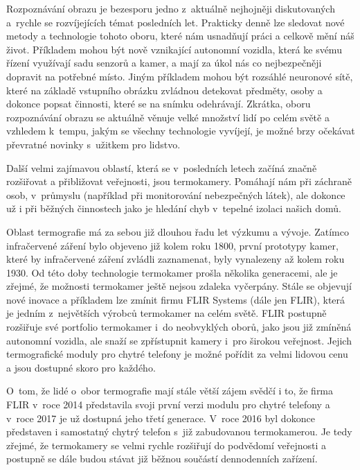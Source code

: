 \begin{introduction}
Rozpoznávání obrazu je bezesporu jedno z~aktuálně nejhojněji diskutovaných a~rychle se rozvíjejících témat posledních let. Prakticky denně lze sledovat nové metody a technologie tohoto oboru, které nám usnadňují práci a celkově mění náš život. Příkladem mohou být nově vznikající autonomní vozidla, která ke svému řízení využívají sadu senzorů a kamer, a mají za úkol nás co nejbezpečněji dopravit na potřebné místo. Jiným příkladem mohou být rozsáhlé neuronové sítě, které na základě vstupního obrázku zvládnou detekovat předměty, osoby a dokonce popsat činnosti, které se na snímku odehrávají. Zkrátka, oboru rozpoznávání obrazu se aktuálně věnuje velké množství lidí po celém světě a vzhledem k~tempu, jakým se všechny technologie vyvíjejí, je možné brzy očekávat převratné novinky s~užitkem pro lidstvo.

Další velmi zajímavou oblastí, která se v~posledních letech začíná značně rozšiřovat a přibližovat veřejnosti, jsou termokamery. Pomáhají nám při záchraně osob, v~průmyslu (například při monitorování nebezpečných látek), ale dokonce už i při běžných činnostech jako je hledání chyb v~tepelné izolaci našich domů.

Oblast termografie má za sebou již dlouhou řadu let výzkumu a vývoje. Zatímco infračervené záření bylo objeveno již kolem roku 1800, první prototypy kamer, které by infračervené záření zvládli zaznamenat, byly vynalezeny až kolem roku 1930. Od této doby technologie termokamer prošla několika generacemi, ale je zřejmé, že možnosti termokamer ještě nejsou zdaleka vyčerpány. Stále se objevují nové inovace a příkladem lze zmínit firmu FLIR Systems (dále jen FLIR), která je jedním z~největších výrobců termokamer na celém světě. FLIR postupně rozšiřuje své portfolio termokamer i~do neobvyklých oborů, jako jsou již zmíněná autonomní vozidla, ale snaží se zpřístupnit kamery i~pro širokou veřejnost. Jejich termografické moduly pro chytré telefony je možné pořídit za velmi lidovou cenu a jsou dostupné skoro pro každého. 

O~tom, že lidé o~obor termografie mají stále větší zájem svědčí i to, že firma FLIR v~roce 2014 představila svoji první verzi modulu pro chytré telefony a v~roce 2017  je už dostupná jeho třetí generace. V~roce 2016 byl dokonce představen i samostatný chytrý telefon s~již zabudovanou termokamerou. Je tedy zřejmé, že termokamery se velmi rychle rozšiřují do podvědomí veřejnosti a postupně se dále budou stávat již běžnou součástí dennodenních zařízení.


\end{introduction}
